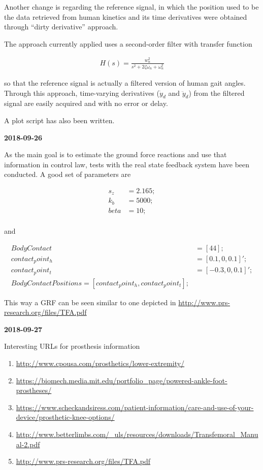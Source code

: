Another change is regarding the reference signal, in which the position used to be the data retrieved from human kinetics and its time derivatives were obtained through ``dirty derivative'' approach.

The approach currently applied uses a second-order filter with transfer function

\begin{align}
	H(s) = \frac{w_{n}^2}{s^2 + 2\zeta \omega_n + \omega_n^2}
\end{align}

so that the reference signal is actually a filtered version of human gait angles. Through this approach, time-varying derivatives ($\dot{y}_d$ and $\ddot{y}_d$) from the filtered signal are easily acquired and with no error or delay.

A plot script has also been written.

\textbf{2018-09-26}

As the main goal is to estimate the ground force reactions and use that information in control law, tests with the real state feedback system have been conducted. A good set of parameters are 

\begin{align}
s_z &= 2.165 ; \\%
k_b &= 5000; \\%
beta &= 10; \\%
\end{align}

and 

\begin{align}
BodyContact &= [ 4 4 ]; \\%
contact_point_h &= [  0.1, 0, 0.1 ]'; \\%
contact_point_t &= [ -0.3, 0, 0.1 ]'; \\%
BodyContactPositions = [ contact_point_h, contact_point_t ];
\end{align}

This way a GRF can be seen similar to one depicted in \url{http://www.prs-research.org/files/TFA.pdf}

\textbf{2018-09-27}

Interesting URLs for prosthesis information
\begin{enumerate}
    \item \url{http://www.cpousa.com/prosthetics/lower-extremity/}
    \item \url{https://biomech.media.mit.edu/portfolio_page/powered-ankle-foot-prostheses/}
    \item \url{https://www.scheckandsiress.com/patient-information/care-and-use-of-your-device/prosthetic-knee-options/}
    \item \url{http://www.betterlimbs.com/_uls/resources/downloads/Transfemoral_Manual-2.pdf}
    \item \url{http://www.prs-research.org/files/TFA.pdf}
\end{enumerate}

